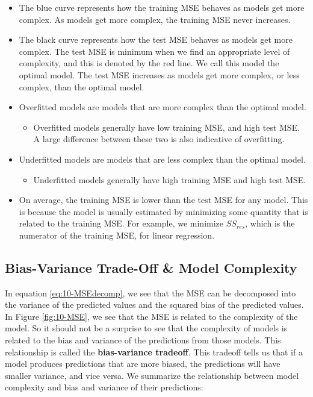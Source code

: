\documentclass[
]{book}
\providecommand{\tightlist}{%
  \setlength{\itemsep}{0pt}\setlength{\parskip}{0pt}}
\begin{document}
\begin{itemize}
\tightlist
\item
  The blue curve represents how the training MSE behaves as models get more complex. As models get more complex, the training MSE never increases.
\item
  The black curve represents how the test MSE behaves as models get more complex. The test MSE is minimum when we find an appropriate level of complexity, and this is denoted by the red line. We call this model the optimal model. The test MSE increases as models get more complex, or less complex, than the optimal model.
\item
  Overfitted models are models that are more complex than the optimal model.

  \begin{itemize}
  \tightlist
  \item
    Overfitted models generally have low training MSE, and high test MSE. A large difference between these two is also indicative of overfitting.
  \end{itemize}
\item
  Underfitted models are models that are less complex than the optimal model.

  \begin{itemize}
  \tightlist
  \item
    Underfitted models generally have high training MSE and high test MSE.
  \end{itemize}
\item
  On average, the training MSE is lower than the test MSE for any model. This is because the model is usually estimated by minimizing some quantity that is related to the training MSE. For example, we minimize \(SS_{res}\), which is the numerator of the training MSE, for linear regression.
\end{itemize}

\hypertarget{bias-variance-trade-off-model-complexity}{%
\subsection{Bias-Variance Trade-Off \& Model Complexity}\label{bias-variance-trade-off-model-complexity}}

In equation \eqref{eq:10-MSEdecomp}, we see that the MSE can be decomposed into the variance of the predicted values and the squared bias of the predicted values. In Figure \ref{fig:10-MSE}, we see that the MSE is related to the complexity of the model. So it should not be a surprise to see that the complexity of models is related to the bias and variance of the predictions from those models. This relationship is called the \textbf{bias-variance tradeoff}. This tradeoff tells us that if a model produces predictions that are more biased, the predictions will have smaller variance, and vice versa. We summarize the relationship between model complexity and bias and variance of their predictions:
\end{document}
